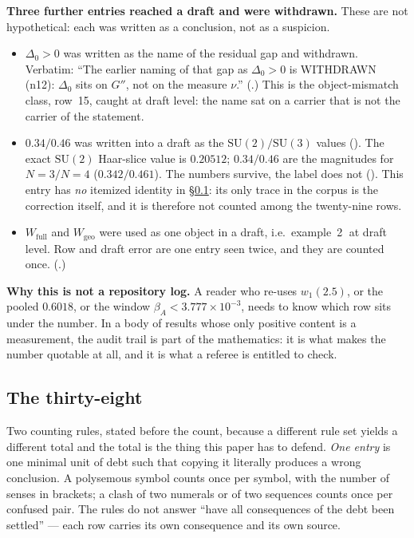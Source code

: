 \begin{v3box}
\textbf{Three further entries reached a draft and were withdrawn.} These are not hypothetical: each was
written as a conclusion, not as a suspicion.
\begin{itemize}[leftmargin=1.5em,itemsep=3pt,topsep=3pt]
\item $\Delta_0>0$ was written as the name of the residual gap and withdrawn. Verbatim: ``The earlier
naming of that gap as $\Delta_0>0$ is WITHDRAWN (n12): $\Delta_0$ sits on $G''$, not on the measure
$\nu$.'' (.) This is the object-mismatch class, row~15, caught at draft
level: the name sat on a carrier that is not the carrier of the statement.
\item $0.34/0.46$ was written into a draft as the $\mathrm{SU}(2)/\mathrm{SU}(3)$ values
(). The exact $\mathrm{SU}(2)$ Haar-slice value is
$0.20512$; $0.34/0.46$ are the magnitudes for $N=3/N=4$ ($0.342/0.461$). The numbers survive, the label
does not (). This entry has \emph{no} itemized identity in
\S\ref{sec:ledger-thirtyeight}: its only trace in the corpus is the correction itself, and it is
therefore not counted among the twenty-nine rows.
\item $W_{\mathrm{full}}$ and $W_{\mathrm{geo}}$ were used as one object in a draft, i.e.\
example~\textcircled{\small2} at draft level. Row and draft error are one entry seen twice, and they are
counted once. (\code{RB:9986}.)
\end{itemize}
\end{v3box}

\noindent\textbf{Why this is not a repository log.} A reader who re-uses $w_1(2.5)$, or the pooled
$0.6018$, or the window $\beta_A<3.777\times10^{-3}$, needs to know which row sits under the number. In a
body of results whose only positive content is a measurement, the audit trail is part of the mathematics:
it is what makes the number quotable at all, and it is what a referee is entitled to check.

\subsection{The thirty-eight}\label{sec:ledger-thirtyeight}

Two counting rules, stated before the count, because a different rule set yields a different total and
the total is the thing this paper has to defend. \emph{One entry} is one minimal unit of debt such that
copying it literally produces a wrong conclusion. A polysemous symbol counts once per symbol, with the
number of senses in brackets; a clash of two numerals or of two sequences counts once per confused pair.
The rules do not answer ``have all consequences of the debt been settled'' --- each row carries its own
consequence and its own source.

